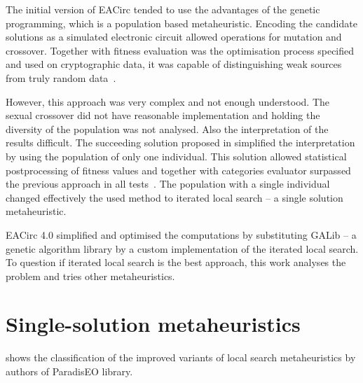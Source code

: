 \documentclass[
  print, %
  Table,   %
  nolof,     %
  nolot,     %
  11pt, %
  oneside  %
]{fithesis3}
\begin{document}
The initial version of EACirc tended to use the advantages of the genetic programming, which is a population based metaheuristic. Encoding the candidate solutions as a simulated electronic circuit allowed operations for mutation and crossover. Together with fitness evaluation was the optimisation process specified and used on cryptographic data, it was capable of distinguishing weak sources from truly random data~\cite{svenda2013towards}.

However, this approach was very complex and not enough understood. The sexual crossover did not have reasonable implementation and holding the diversity of the population was not analysed. Also the interpretation of the results difficult. The succeeding solution proposed in \cite{sys2014constructing} simplified the interpretation by using the population of only one individual. This solution allowed statistical postprocessing of fitness values and together with categories evaluator surpassed the previous approach in all tests~\cite{sys2014constructing}. The population with a single individual changed effectively the used method to iterated local search -- a single solution metaheuristic.

EACirc 4.0 simplified and optimised the computations by substituting GALib -- a genetic algorithm library by a custom implementation of the iterated local search. To question if iterated local search is the best approach, this work analyses the problem and tries other metaheuristics.

\section{Single-solution metaheuristics}
\label{sec:opt-single-sol}

 shows the classification of the improved variants of local search metaheuristics by authors of ParadisEO library.
\end{document}
